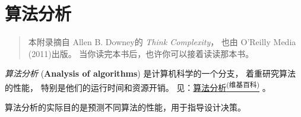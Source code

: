 

\chapter{算法分析}
\label{algorithms}


\begin{quote}
本附录摘自 Allen B. Downey的 {\em Think Complexity}， 也由 O’Reilly Media (2011)出版。 当你读完本书后，也许你可以接着读读那本书。
\end{quote}


{\em 算法分析} ({\bf Analysis of algorithms}) 是计算机科学的一个分支，
 着重研究算法的性能， 特别是他们的运行时间和资源开销。
见：\href{http://en.wikipedia.org/wiki/Analysis_of_algorithms}{算法分析\textsuperscript{(维基百科)}} 。

 




算法分析的实际目的是预测不同算法的性能，用于指导设计决策。


